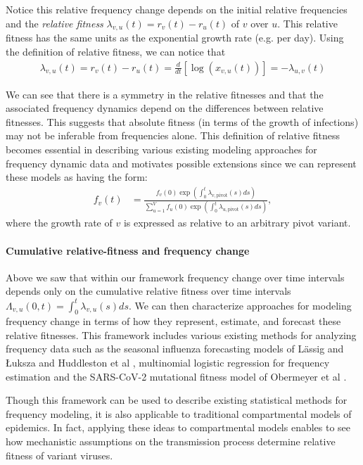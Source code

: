 \documentclass[11pt,oneside,letterpaper]{article}
\begin{document}
Notice this relative frequency change depends on the initial relative frequencies and the \emph{relative fitness} $\lambda_{v,u}(t) = r_{v}(t) - r_{u}(t)$ of $v$ over $u$.
This relative fitness has the same units as the exponential growth rate (e.g. per day).
Using the definition of relative fitness, we can notice that
\begin{align}
\lambda_{v, u}(t) = r_{v}(t) - r_{u}(t) = \frac{d }{d t} \left[\log \left( x_{v,u}(t) \right) \right] = - \lambda_{u,v}(t)
\end{align}

We can see that there is a symmetry in the relative fitnesses and that the associated frequency dynamics depend on the differences between relative fitnesses.
This suggests that absolute fitness (in terms of the growth of infections) may not be inferable from frequencies alone.
This definition of relative fitness becomes essential in describing various existing modeling approaches for frequency dynamic data and motivates possible extensions since we can represent these models as having the form:
\begin{align}
    f_{v}(t) &= \frac{ f_{v}(0) \exp( \int_{0}^{t} \lambda_{v, \text{pivot}}(s) ds)}{\sum_{u=1}^{V}  f_{u}(0) \exp( \int_{0}^{t} \lambda_{u, \text{pivot}}(s) ds)},
\end{align}
where the growth rate of $v$ is expressed as relative to an arbitrary pivot variant.

\paragraph{Cumulative relative-fitness and frequency change}

Above we saw that within our framework frequency change over time intervals depends only on the cumulative relative fitness over time intervals $\Lambda_{v,u}(0, t) = \int_{0}^{t} \lambda_{v, u}(s)ds$.
We can then characterize approaches for modeling frequency change in terms of how they represent, estimate, and forecast these relative fitnesses.
This framework includes various existing methods for analyzing frequency data such as the seasonal influenza forecasting models of L{\"a}ssig and {\L}uksza \cite{luksza2014predictive} and Huddleston et al \cite{Huddleston2020}, multinomial logistic regression for frequency estimation \cite{Annavajhala2021} and the SARS-CoV-2 mutational fitness model of Obermeyer et al \cite{Obermeyer2022}.

Though this framework can be used to describe existing statistical methods for frequency modeling, it is also applicable to traditional compartmental models of epidemics.
In fact, applying these ideas to compartmental models enables to see how mechanistic assumptions on the transmission process determine relative fitness of variant viruses.
\end{document}

